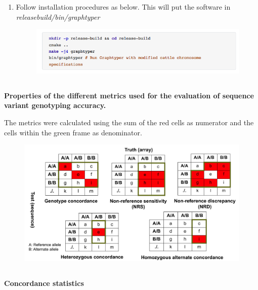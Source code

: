 \documentclass[../main.tex]{subfiles}
\begin{document}
\begin{flushleft}
\begin{enumerate}
    \item Follow installation procedures as below. This will put the software in \emph{releasebuild/bin/graphtyper}
    
    \begin{figure}[!htb]
        \centering
        \includegraphics[width=\textwidth]{paper1/supplement/sp15.png}
    \end{figure}

\end{enumerate}

\newpage

\subsection{}
\label{supp_mat:22}
\textbf{\large{Properties of the different metrics used for the evaluation of sequence variant genotyping accuracy.}}


The metrics were calculated using the sum of the red cells as numerator and the cells within the green frame as denominator.
\bigskip
\bigskip
\bigskip

\begin{figure}[!htb]
    \centering
    \includegraphics[width=\textwidth]{paper1/supplement/sp2.png}
\end{figure}

\newpage

\begin{landscape}


\subsection{}
\label{supp_mat:23}
\textbf{\large{Concordance statistics}}



\end{landscape}
\end{flushleft}
\end{document}
